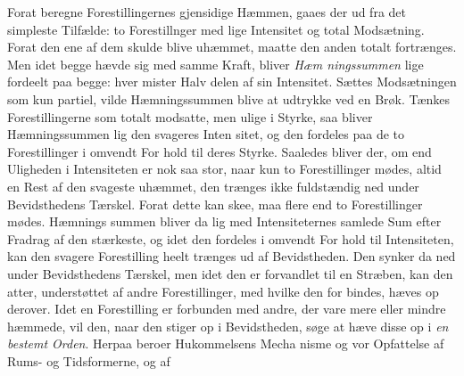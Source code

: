 \documentclass[12pt,a4paper]{book}
\begin{document}
Forat beregne Forestillingernes gjensidige Hæmmen,
gaaes der ud fra det simpleste Tilfælde: to Forestillnger med
lige Intensitet og total Modsætning. Forat den ene af dem
skulde blive uhæmmet, maatte den anden totalt fortrænges.
Men idet begge hævde sig med samme Kraft, bliver \emph{Hæm\-%
ningssummen} lige fordeelt paa begge: hver mister Halv\-%
delen af sin Intensitet. Sættes Modsætningen som kun partiel,
vilde Hæmningssummen blive at udtrykke ved en Brøk.
Tænkes Forestillingerne som totalt modsatte, men ulige i
Styrke, saa bliver Hæmningssummen lig den svageres Inten\-%
sitet, og den fordeles paa de to Forestillinger i omvendt For\-%
hold til deres Styrke. Saaledes bliver der, om end Uligheden
i Intensiteten er nok saa stor, naar kun to Forestillinger
mødes, altid en Rest af den svageste uhæmmet, den trænges
ikke fuldstændig ned under Bevidsthedens Tærskel. Forat dette
kan skee, maa flere end to Forestillinger mødes. Hæmnings\-%
summen bliver da lig med Intensiteternes samlede Sum efter
Fradrag af den stærkeste, og idet den fordeles i omvendt For\-%
hold til Intensiteten, kan den svagere Forestilling heelt trænges
ud af Bevidstheden. Den synker da ned under Bevidsthedens
Tærskel, men idet den er forvandlet til en Stræben, kan den
atter, understøttet af andre Forestillinger, med hvilke den for\-%
bindes, hæves op derover. Idet en Forestilling er forbunden
med andre, der vare mere eller mindre hæmmede, vil den,
naar den stiger op i Bevidstheden, søge at hæve disse op i
\emph{en bestemt Orden}. Herpaa beroer Hukommelsens Mecha\-%
nisme og vor Opfattelse af Rums- og Tidsformerne, og af
\end{document}
